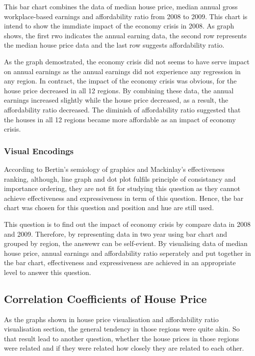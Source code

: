 \documentclass{article}
\begin{document}
This bar chart combines the data of median house price, median annual gross workplace-based earnings and 
affordability ratio from 2008 to 2009. This chart is intend to show the immdiate impact of the economy crisis 
in 2008. As graph shows, the first rwo indicates the annual earning data, the second row represents the median 
house price data and the last row suggests affordability ratio. 

As the graph demostrated, the economy crisis did not seems to have serve impact on annual earnings as the 
annual earnings did not experience any regression in any region. In contract, the impact of the economy crisis 
was obvious, for the house price decreased in all 12 regions. By combining these data, the annual earnings increased 
slightly while the house price decreased, as a result, the affordability ratio decreased. The diminish of 
affordability ratio suggested that the houses in all 12 regions became more affordable as an impact of 
economy crisis. 

\subsubsection{Visual Encodings}
According to Bertin's semiology of graphics and Mackinlay's effectiveness ranking, although, line graph and 
dot plot fulfils principle of consistancy and importance ordering, they are not fit for studying this question 
as they cannot achieve effectiveness and expressiveness in term of this question. Hence, the bar chart was 
chosen for this question and position and hue are still used.

This question is to find out the impact of economy crisis by compare data in 2008 and 2009. Therefore, by 
representing data in two year using bar chart and grouped by region, the answewr can be self-evient. 
By visualising data of median house price, annual earnings and affordability ratio seperately and put 
together in the bar chart, effectiveness and expressiveness are achieved in an appropriate level to answer
this question.


\subsection{Correlation Coefficients of House Price}
As the graphs shown in house price visualisation and affordability ratio visualisation section, the general 
tendency in those regions were quite akin. So that result lead to another question, whether the house prices 
in those regions were related and if they were related how closely they are related to each other.
\end{document}
